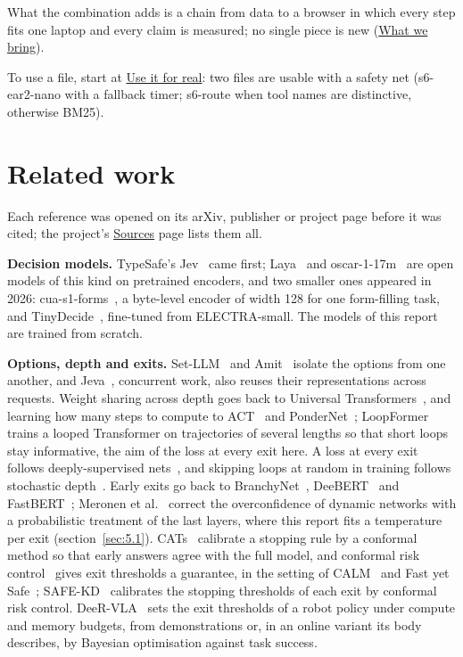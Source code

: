 \documentclass[10pt]{article}
\begin{document}
What the combination adds is a chain from data to a browser in which every step fits one laptop and every claim is measured; no single piece is new (\href{https://maxgfr.github.io/skycmd/novelty/\#at-a-glance}{What we bring}).

To use a file, start at \href{https://maxgfr.github.io/skycmd/use/}{Use it for real}: two files are usable with a safety net (s6-ear2-nano with a fallback timer; s6-route when tool names are distinctive, otherwise BM25).

\section{Related work}\label{sec:2}

Each reference was opened on its arXiv, publisher or project page before it was cited; the project's \href{https://maxgfr.github.io/skycmd/sources/}{Sources} page lists them all.

\textbf{Decision models.} TypeSafe's Jev~\cite{jev} came first; Laya~\cite{laya} and oscar-1-17m~\cite{oscar} are open models of this kind on pretrained encoders, and two smaller ones appeared in 2026: cua-s1-forms~\cite{cua}, a byte-level encoder of width 128 for one form-filling task, and TinyDecide~\cite{tinydecide}, fine-tuned from ELECTRA-small. The models of this report are trained from scratch.

\textbf{Options, depth and exits.} Set-LLM~\cite{egressy2025setllm} and Amit~\cite{amit2026permutation} isolate the options from one another, and Jeva~\cite{li2026jeva}, concurrent work, also reuses their representations across requests. Weight sharing across depth goes back to Universal Transformers~\cite{dehghani2019ut}, and learning how many steps to compute to ACT~\cite{graves2016act} and PonderNet~\cite{banino2021pondernet}; LoopFormer~\cite{jeddi2026loopformer} trains a looped Transformer on trajectories of several lengths so that short loops stay informative, the aim of the loss at every exit here. A loss at every exit follows deeply-supervised nets~\cite{lee2014dsn}, and skipping loops at random in training follows stochastic depth~\cite{huang2016stochastic}. Early exits go back to BranchyNet~\cite{teerapittayanon2017branchynet}, DeeBERT~\cite{xin2020deebert} and FastBERT~\cite{liu2020fastbert}; Meronen et al.~\cite{meronen2024overconfidence} correct the overconfidence of dynamic networks with a probabilistic treatment of the last layers, where this report fits a temperature per exit (section~\ref{sec:5.1}). CATs~\cite{schuster2021cats} calibrate a stopping rule by a conformal method so that early answers agree with the full model, and conformal risk control~\cite{angelopoulos2022crc} gives exit thresholds a guarantee, in the setting of CALM~\cite{schuster2022calm} and Fast yet Safe~\cite{jazbec2024fastyetsafe}; SAFE-KD~\cite{khazem2026safekd} calibrates the stopping thresholds of each exit by conformal risk control. DeeR-VLA~\cite{yue2024deer} sets the exit thresholds of a robot policy under compute and memory budgets, from demonstrations or, in an online variant its body describes, by Bayesian optimisation against task success.
\end{document}
